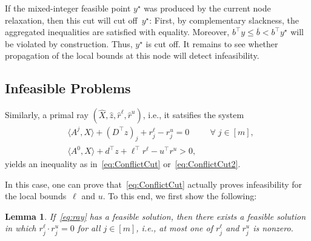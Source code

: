\documentclass[10pt, a4paper]{article}
\newcommand{\skal}[2]{\langle{#1},{#2}\rangle}
\newcommand{\T}{^{\top}}
\newtheorem{lemma}[theorem]{Lemma}
\begin{document}
If the mixed-integer feasible point $y^\star$ was produced by the current
node relaxation, then this cut will cut off~$y^\star$: First, by
complementary slackness, the aggregated inequalities are satisfied with
equality. Moreover, $b\T y \leq \overline{b} < b\T y^\star$ will be
violated by construction. Thus, $y^\star$ is cut off. It remains to see
whether propagation of the local bounds at this node will detect
infeasibility.

\subsection{Infeasible Problems}

Similarly, a primal ray $(\hat{X}, \hat{z}, \hat{r}^\ell, \hat{r}^u)$,
i.e., it satsifies the system
\begin{equation}\label{eq:ray}
\begin{aligned}
  & \skal{A^j}{X} + (D\T z)_j + r^\ell_j - r^u_j = 0 && \forall\; j \in [m],\\
  & \skal{A^0}{X} + d\T z + \ell\T r^\ell - u\T r^u > 0,
\end{aligned}
\end{equation}
yields an inequality as in~\eqref{eq:ConflictCut}
or~\eqref{eq:ConflictCut2}.

In this case, one can prove that~\eqref{eq:ConflictCut} actually proves
infeasibility for the local bounds~$\ell$ and $u$. To this end, we first
show the following:

\begin{lemma}\label{lemma:ComplemenatrySolution}
  If~\eqref{eq:ray} has a feasible solution, then there exists a feasible
  solution in which $r_j^\ell \cdot r_j^u = 0$ for all $j \in [m]$, i.e.,
  at most one of $r_j^\ell$ and $r_j^u$ is nonzero.
\end{lemma}
\end{document}

